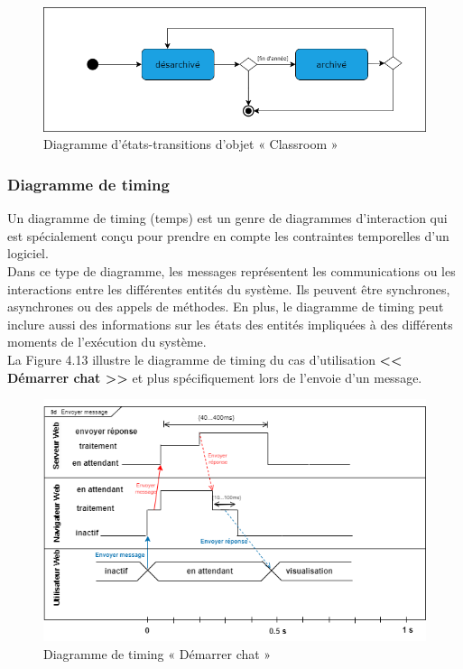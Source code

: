 \begin{figure}[H]
    \centering
    \includegraphics[width=\textwidth,height=0.28\textwidth]{images/chp4/fig12.png}
    \caption{Diagramme d’états-transitions d'objet « Classroom »}
    \label{fig:Diagramme d’états-transitions d'objet « Classroom »}    
\end{figure}

\subsubsection{Diagramme de timing}
Un diagramme de timing (temps) est un genre de diagrammes d'interaction qui est spécialement conçu pour prendre en compte les contraintes temporelles d'un logiciel.\\
Dans ce type de diagramme, les messages représentent les communications ou les interactions entre les différentes entités du système. Ils peuvent être synchrones, asynchrones ou des appels de méthodes. En plus, le diagramme de timing peut inclure aussi des informations sur les états des entités impliquées à des différents moments de l’exécution du système.\\
La Figure 4.13 illustre le diagramme de timing du cas d’utilisation \textbf{<< Démarrer chat >>} et plus spécifiquement lors de l’envoie d’un message.

\begin{figure}[H]
    \centering
    \includegraphics[width=\textwidth]{images/chp4/fig13.png}
    \caption{Diagramme de timing « Démarrer chat »}
    \label{fig:Diagramme de timing « Démarrer chat »}    
\end{figure}


